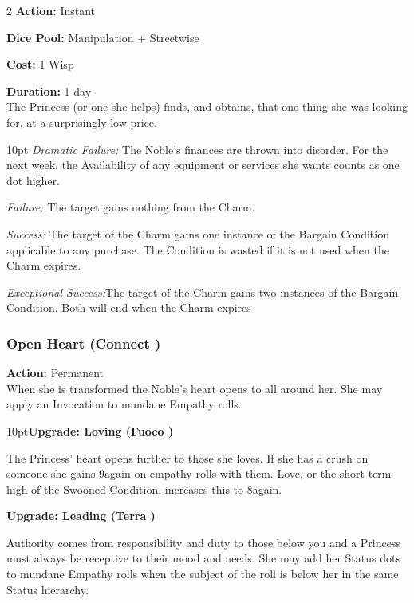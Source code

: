 \begin{multicols}{2}
\noindent \textbf{Action:} Instant

\noindent \textbf{Dice Pool:} Manipulation + Streetwise

\noindent \textbf{Cost:} 1 Wisp

\noindent \textbf{Duration:} 1 day \\

\noindent The Princess (or one she helps) finds, and obtains, that one thing she was looking for, at a surprisingly low price.

\begin{myindentpar}{10pt}    \emph{Dramatic Failure:} The Noble’s finances are thrown into disorder. For the next week, the Availability of any equipment or services she wants counts as one dot higher.

\emph{Failure:} The target gains nothing from the Charm.

\emph{Success:} The target of the Charm gains one instance of the Bargain Condition applicable to any purchase. The Condition is wasted if it is not used when the Charm expires. 

\emph{Exceptional Success:}The target of the Charm gains two instances of the Bargain Condition. Both will end when the Charm expires \end{myindentpar}

\subsubsection*{Open Heart (Connect \textbullet)}

\noindent \textbf{Action:} Permanent \\

\noindent When she is transformed the Noble's heart opens to all around her. She may apply an Invocation to mundane Empathy rolls. 

\begin{myindentpar}{10pt}\textbf{Upgrade: Loving (Fuoco \textbullet)}

	The Princess' heart opens further to those she loves. If she has a crush on someone she gains 9again on empathy rolls with them. Love, or the short term high of the Swooned Condition, increases this to 8again.
	
	\textbf{Upgrade: Leading (Terra \textbullet\textbullet)}

	Authority comes from responsibility and duty to those below you and a Princess must always be receptive to their mood and needs. She may add her Status dots to mundane Empathy rolls when the subject of the roll is below her in the same Status hierarchy. 
	

\end{myindentpar}
\end{multicols}
